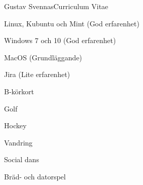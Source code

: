 \documentclass{article}
\begin{document}
\begin{cv}{Gustav Svennas}{Curriculum Vitae}
\cvseparator
\begin{cvitem}
    Linux, Kubuntu och Mint (God erfarenhet)
\end{cvitem}

\cvseparator
\begin{cvitem}
    Windows 7 och 10 (God erfarenhet)
\end{cvitem}

\cvseparator
\begin{cvitem}
    MacOS (Grundläggande)
\end{cvitem}

\cvseparator
\begin{cvitem}
    Jira (Lite erfarenhet)
\end{cvitem}

\cvseparator
\begin{cvitem}
    B-körkort
\end{cvitem}






\cvseparator
\begin{cvitem}
    Golf
\end{cvitem}

\cvseparator
\begin{cvitem}
    Hockey 
\end{cvitem}

\cvseparator
\begin{cvitem}
    Vandring
\end{cvitem}

\cvseparator
\begin{cvitem}
    Social dans
\end{cvitem}

\cvseparator
\begin{cvitem}
    Bräd- och datorspel
\end{cvitem}


\end{cv}
\end{document}

